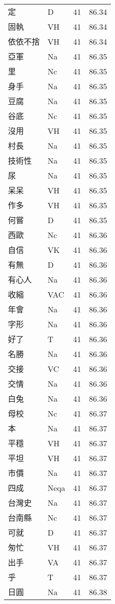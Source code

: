 \documentclass[twocolumn]{book}
\begin{document}
\begin{supertabular}{llrr}
定 & D & 41 &  86.34\\
固執 & VH & 41 &  86.34\\
依依不捨 & VH & 41 &  86.34\\
亞軍 & Na & 41 &  86.35\\
里 & Nc & 41 &  86.35\\
身手 & Na & 41 &  86.35\\
豆腐 & Na & 41 &  86.35\\
谷底 & Nc & 41 &  86.35\\
沒用 & VH & 41 &  86.35\\
村長 & Na & 41 &  86.35\\
技術性 & Na & 41 &  86.35\\
尿 & Na & 41 &  86.35\\
呆呆 & VH & 41 &  86.35\\
作多 & VH & 41 &  86.35\\
何嘗 & D & 41 &  86.35\\
西歐 & Nc & 41 &  86.36\\
自信 & VK & 41 &  86.36\\
有無 & D & 41 &  86.36\\
有心人 & Na & 41 &  86.36\\
收縮 & VAC & 41 &  86.36\\
年會 & Na & 41 &  86.36\\
字形 & Na & 41 &  86.36\\
好了 & T & 41 &  86.36\\
名勝 & Na & 41 &  86.36\\
交接 & VC & 41 &  86.36\\
交情 & Na & 41 &  86.36\\
白兔 & Na & 41 &  86.36\\
母校 & Nc & 41 &  86.37\\
本 & Na & 41 &  86.37\\
平穩 & VH & 41 &  86.37\\
平坦 & VH & 41 &  86.37\\
市價 & Na & 41 &  86.37\\
四成 & Neqa & 41 &  86.37\\
台灣史 & Na & 41 &  86.37\\
台南縣 & Nc & 41 &  86.37\\
可就 & D & 41 &  86.37\\
匆忙 & VH & 41 &  86.37\\
出手 & VA & 41 &  86.37\\
乎 & T & 41 &  86.37\\
日圓 & Na & 41 &  86.38\\

\end{supertabular}
\end{document}
